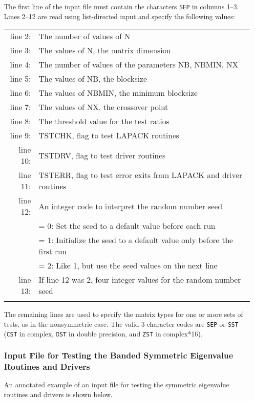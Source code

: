 The first line of the input file 
must contain the characters {\tt SEP} in columns 1--3.
Lines 2--12 are read using list-directed input and specify the following
values:

\begin{tabular}{r l}
\\
line 2: & The number of values of N \\
line 3: & The values of N, the matrix dimension \\
line 4: & The number of values of the parameters NB, NBMIN, NX \\
line 5: & The values of NB, the blocksize \\
line 6: & The values of NBMIN, the minimum blocksize \\
line 7: & The values of NX, the crossover point \\
line 8: & The threshold value for the test ratios \\
line 9: & TSTCHK, flag to test LAPACK routines \\
line 10:& TSTDRV, flag to test driver routines \\
line 11:& TSTERR, flag to test error exits from LAPACK and driver
routines \\
line 12: & An integer code to interpret the random number seed \\
        & = 0:  Set the seed to a default value before each run \\
        & = 1:  Initialize the seed to a default value only before the
first run \\
        & = 2:  Like 1, but use the seed values on the next line \\
line 13:& If line 12 was 2, four integer values for the random number
seed \\
        &
\end{tabular}

\noindent
The remaining lines are used to specify the matrix types for one
or more sets of tests, as in the nonsymmetric case.
The valid 3-character codes are {\tt SEP} or {\tt SST} ({\tt CST}
in complex, {\tt DST} in double precision, and {\tt ZST} in
complex*16).

\subsubsection{Input File for Testing the Banded Symmetric Eigenvalue Routines
and Drivers}

\dent
An annotated example of an input file for testing the symmetric
eigenvalue routines and drivers is shown below.

